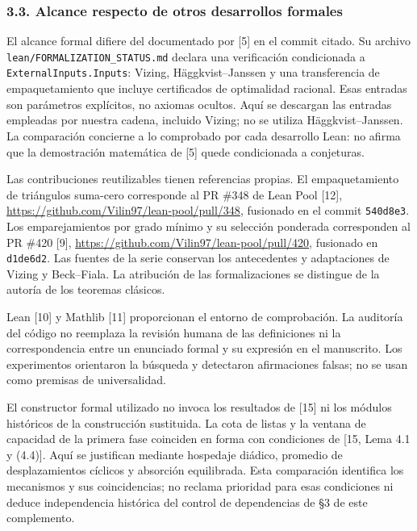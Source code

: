 \documentclass[spanish,11pt,a4paper]{article}
\begin{document}
\subsubsection{3.3. Alcance respecto de otros desarrollos
formales}\label{alcance-respecto-de-otros-desarrollos-formales}

El alcance formal difiere del documentado por {[}5{]} en el commit
citado. Su archivo \nolinkurl{lean/FORMALIZATION_STATUS.md} declara una
verificación condicionada a \nolinkurl{ExternalInputs.Inputs}: Vizing,
Häggkvist--Janssen y una transferencia de empaquetamiento que incluye
certificados de optimalidad racional. Esas entradas son parámetros
explícitos, no axiomas ocultos. Aquí se descargan las entradas empleadas
por nuestra cadena, incluido Vizing; no se utiliza Häggkvist--Janssen.
La comparación concierne a lo comprobado por cada desarrollo Lean: no
afirma que la demostración matemática de {[}5{]} quede condicionada a
conjeturas.

Las contribuciones reutilizables tienen referencias propias. El
empaquetamiento de triángulos suma-cero corresponde al PR \#348 de Lean
Pool {[}12{]}, \url{https://github.com/Vilin97/lean-pool/pull/348},
fusionado en el commit \nolinkurl{540d8e3}. Los emparejamientos por grado
mínimo y su selección ponderada corresponden al PR \#420 {[}9{]},
\url{https://github.com/Vilin97/lean-pool/pull/420}, fusionado en
\nolinkurl{d1de6d2}. Las fuentes de la serie conservan los antecedentes y
adaptaciones de Vizing y Beck--Fiala. La atribución de las
formalizaciones se distingue de la autoría de los teoremas clásicos.

Lean {[}10{]} y Mathlib {[}11{]} proporcionan el entorno de
comprobación. La auditoría del código no reemplaza la revisión humana de
las definiciones ni la correspondencia entre un enunciado formal y su
expresión en el manuscrito. Los experimentos orientaron la búsqueda y
detectaron afirmaciones falsas; no se usan como premisas de
universalidad.

El constructor formal utilizado no invoca los resultados de {[}15{]} ni
los módulos históricos de la construcción sustituida. La cota de listas
y la ventana de capacidad de la primera fase coinciden en forma con
condiciones de {[}15, Lema 4.1 y (4.4){]}. Aquí se justifican mediante
hospedaje diádico, promedio de desplazamientos cíclicos y absorción
equilibrada. Esta comparación identifica los mecanismos y sus
coincidencias; no reclama prioridad para esas condiciones ni deduce
independencia histórica del control de dependencias de §3 de este
complemento.
\end{document}
